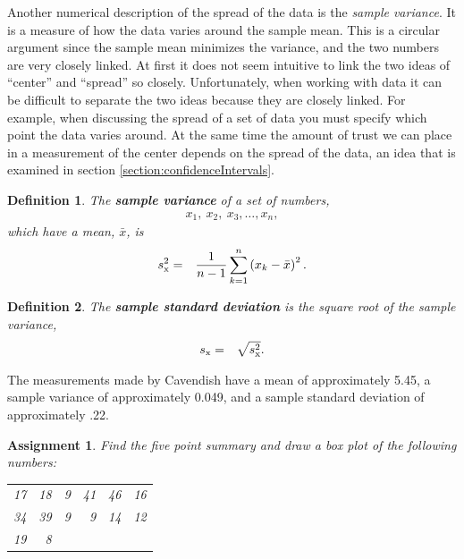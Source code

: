 \documentclass[12pt]{article}
\newtheorem{definition}{Definition}[section]
\newtheorem{assignment}{Assignment}[section]
\newcommand{\lp}{\left(}
\newcommand{\rp}{\right)}
\begin{document}
Another numerical description of the spread of the data is the
\textit{sample variance}. It is a measure of how the data varies
around the sample mean. This is a circular argument since the sample
mean minimizes the variance, and the two numbers are very closely
linked.  At first it does not seem intuitive to link the two ideas of
``center'' and ``spread'' so closely. Unfortunately, when working with
data it can be difficult to separate the two ideas because they are
closely linked. For example, when discussing the spread of a set of
data you must specify which point the data varies around. At the same
time the amount of trust we can place in a measurement of the center
depends on the spread of the data, an idea that is examined in section
\ref{section:confidenceIntervals}.

\begin{definition}
  The \textbf{sample variance} of a set of numbers,
  \begin{eqnarray*}
    x_1,~x_2,~x_3,\ldots,x_n,
  \end{eqnarray*}
  which have a mean, $\bar{x}$, is
  \begin{eqnarray}
    \label{eqn:sampleVariance}
    s^2_{\rm x} & = & \frac{1}{n-1} \sum^n_{k=1} \lp x_k - \bar{x} \rp^2.
  \end{eqnarray}
\end{definition}

\begin{definition}
  The \textbf{sample standard deviation} is the square root of the
  sample variance,
  \begin{eqnarray}
    \label{eqn:sampleStandardDeviation}
    s_{\rm x} & = & \sqrt{s^2_{\rm x}}.
  \end{eqnarray}
\end{definition}

The measurements made by Cavendish have a mean of approximately 5.45,
a sample variance of approximately  0.049, and a sample standard
deviation of approximately .22.

\begin{assignment}
  Find the five point summary and draw a box plot of the following numbers:
  \begin{center}
    \begin{tabular}{rrrrrr}
      17 & 18 & 9 & 41 & 46 & 16 \\
      34 & 39 & 9 & 9  & 14 & 12 \\
      19 & 8      
    \end{tabular}
  \end{center}

\end{assignment}
\end{document}
